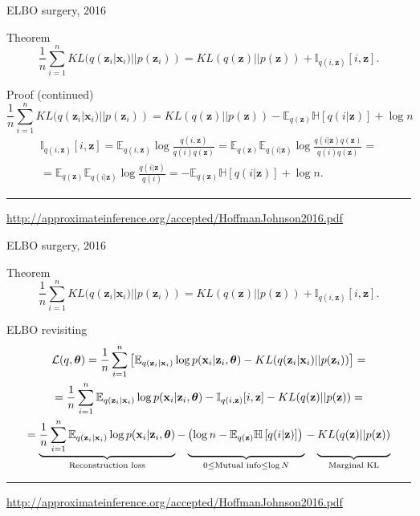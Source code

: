 \documentclass{beamer}
\newcommand{\bx}{\mathbf{x}}
\newcommand{\bz}{\mathbf{z}}
\newcommand{\btheta}{\boldsymbol{\theta}}
\begin{document}
\begin{frame}{ELBO surgery, 2016}
\begin{block}{Theorem}
\[
    \frac{1}{n} \sum_{i=1}^n KL(q(\bz_i | \bx_i) || p(\bz_i)) = KL(q(\bz) || p(\bz)) + \mathbb{I}_{q(i, \bz)} [i, \bz].
\]
\end{block}
\begin{block}{Proof (continued)}
{\footnotesize
\[
    \frac{1}{n} \sum_{i=1}^n KL(q(\bz_i | \bx_i) || p(\bz_i)) = KL (q(\bz) || p(\bz)) - \mathbb{E}_{q(\bz)} \mathbb{H} \left[q(i | \bz) \right] + \log n
\]
\begin{multline*}
    \mathbb{I}_{q(i, \bz)} [i, \bz] = \mathbb{E}_{q(i, \bz)} \log \frac{q(i, \bz)}{q(i)q(\bz)} = \mathbb{E}_{q(\bz)} \mathbb{E}_{q(i | \bz)} \log \frac{q(i | \bz) q(\bz)}{q(i)q(\bz)} = \\
    = \mathbb{E}_{q(\bz)} \mathbb{E}_{q(i | \bz)} \log \frac{q(i | \bz)}{q(i)} = - \mathbb{E}_{q(\bz)} \mathbb{H} \left[ q(i | \bz) \right] + \log n.
\end{multline*}
}
\end{block}
\vfill
\hrule\medskip
{\scriptsize \href{http://approximateinference.org/accepted/HoffmanJohnson2016.pdf}{http://approximateinference.org/accepted/HoffmanJohnson2016.pdf}}
\end{frame}
\begin{frame}{ELBO surgery, 2016}
\begin{block}{Theorem}
\[
    \frac{1}{n} \sum_{i=1}^n KL(q(\bz_i | \bx_i) || p(\bz_i)) = KL(q(\bz) || p(\bz)) + \mathbb{I}_{q(i, \bz)} [i, \bz].
\]
\end{block}
\begin{block}{ELBO revisiting}
{\footnotesize
\begin{multline*}
    \mathcal{L}(q, \btheta) = \frac{1}{n} \sum_{i=1}^n \left[ \mathbb{E}_{q(\bz_i | \bx_i)} \log p(\bx_i | \bz_i, \btheta) - KL(q(\bz_i | \bx_i) || p(\bz_i)) \right] = \\
    = \frac{1}{n} \sum_{i=1}^n \mathbb{E}_{q(\bz_i | \bx_i)} \log p(\bx_i | \bz_i, \btheta) - \mathbb{I}_{q(i, \bz)} [i, \bz] - KL(q(\bz) || p(\bz)) = \\
    = \underbrace{\frac{1}{n} \sum_{i=1}^n \mathbb{E}_{q(\bz_i | \bx_i)} \log p(\bx_i | \bz_i, \btheta)}_{\text{Reconstruction loss}} - \underbrace{\left(\log n - \mathbb{E}_{q(\bz)} \mathbb{H} \left[ q(i | \bz) \right] \right)\vphantom{\sum_{i=1}} }_{0 \leq \text{Mutual info} \leq \log N } - \underbrace{KL(q(\bz) || p(\bz))\vphantom{\sum_{i=1}}}_{\text{Marginal KL}}
\end{multline*}
}
\end{block}
\vfill
\hrule\medskip
{\scriptsize \href{http://approximateinference.org/accepted/HoffmanJohnson2016.pdf}{http://approximateinference.org/accepted/HoffmanJohnson2016.pdf}}
\end{frame}
\end{document}
